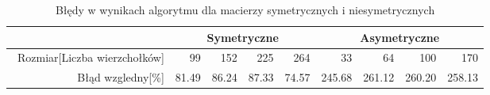 \begin{table}
\begin{tabular}{|r|r|r|r|r|r|r|r|r|}
\hline
 & \multicolumn{4}{|c|}{Symetryczne} & \multicolumn{4}{|c|}{Asymetryczne} \\ \hline\
Rozmiar[Liczba wierzchołków] & 99 & 152 & 225 & 264 & 33 & 64 & 100 & 170 \\ \hline
Błąd wzgledny[\%] & 81.49 & 86.24 & 87.33 & 74.57 & 245.68 & 261.12 & 260.20 & 258.13 \\ \hline
\end{tabular}
\caption{Błędy w wynikach algorytmu dla macierzy symetrycznych i niesymetrycznych}
\label{tab:error_TsRandom}
\end{table}
